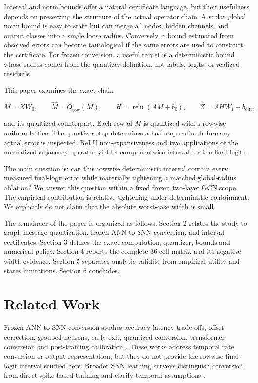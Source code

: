 \documentclass{article}
\begin{document}
Interval and norm bounds offer a natural certificate language, but their usefulness depends on preserving the structure of the actual operator chain. A scalar global norm bound is easy to state but can merge all nodes, hidden channels, and output classes into a single loose radius. Conversely, a bound estimated from observed errors can become tautological if the same errors are used to construct the certificate. For frozen conversion, a useful target is a deterministic bound whose radius comes from the quantizer definition, not labels, logits, or realized residuals.

This paper examines the exact chain

\[
M=XW_0,\qquad \widehat M=Q_{\mathrm{row}}(M),\qquad
H=\operatorname{relu}(AM+b_0),\qquad
Z=AHW_1+b_{\mathrm{out}},
\]

and its quantized counterpart. Each row of \(M\) is quantized with a rowwise uniform lattice. The quantizer step determines a half-step radius before any actual error is inspected. ReLU non-expansiveness and two applications of the normalized adjacency operator yield a componentwise interval for the final logits.

The main question is: can this rowwise deterministic interval contain every measured final-logit error while materially tightening a matched global-radius ablation? We answer this question within a fixed frozen two-layer GCN scope. The empirical contribution is relative tightening under deterministic containment. We explicitly do not claim that the absolute worst-case width is small.

The remainder of the paper is organized as follows. Section 2 relates the study to graph-message quantization, frozen ANN-to-SNN conversion, and interval certificates. Section 3 defines the exact computation, quantizer, bounds and numerical policy. Section 4 reports the complete 36-cell matrix and its negative width evidence. Section 5 separates analytic validity from empirical utility and states limitations. Section 6 concludes.

\section{Related Work}

\label{sec:related\_work}

Frozen ANN-to-SNN conversion studies accuracy-latency trade-offs, offset correction, grouped neurons, early exit, quantized conversion, transformer conversion and post-training calibration \cite{one-spike,hao2023offset,lv2024group,bu2023optimal,li2023seenn,hu2023fast,you2024spikezip,zhao2025ttfs,huang2025ecmt,li2024erroraware}. These works address temporal rate conversion or output representation, but they do not provide the rowwise final-logit interval studied here. Broader SNN learning surveys distinguish conversion from direct spike-based training and clarify temporal assumptions \cite{dampfhoffer2023snnlearning,nunes2022snnsurvey,wang2022taxonomicsnn}.
\end{document}
